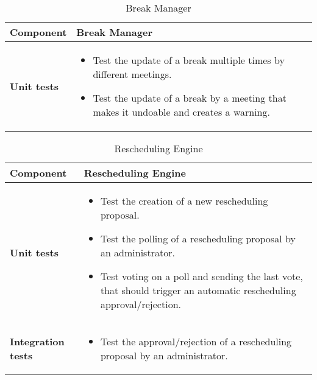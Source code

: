 \begin{table}[h]	
	\centering
	\def\arraystretch{1.5}
	\begin{tabular}{|m{4cm}|m{12cm}|}
		\hline
		\textbf{Component} & Break Manager \\ \hline
		\textbf{Unit tests} & 
			\begin{itemize}
			\item Test the update of a break multiple times by different meetings.
			\item Test the update of a break by a meeting that makes it undoable and creates a warning.
			\end{itemize} \\ \hline
	\end{tabular}
	\caption{Break Manager}
\end{table}

\begin{table}[h]	
	\centering
	\def\arraystretch{1.5}
	\begin{tabular}{|m{4cm}|m{12cm}|}
		\hline
		\textbf{Component} & Rescheduling Engine \\ \hline
		\textbf{Unit tests} & 
			\begin{itemize}
			\item Test the creation of a new rescheduling proposal.
			\item Test the polling of a rescheduling proposal by an administrator.
			\item Test voting on a poll and sending the last vote, that should trigger an automatic rescheduling approval/rejection.
			\end{itemize} \\ \hline
		\textbf{Integration tests} & 
			\begin{itemize}
			\item Test the approval/rejection of a rescheduling proposal by an administrator.
			\end{itemize} \\ \hline
	\end{tabular}
	\caption{Rescheduling Engine}
\end{table}

